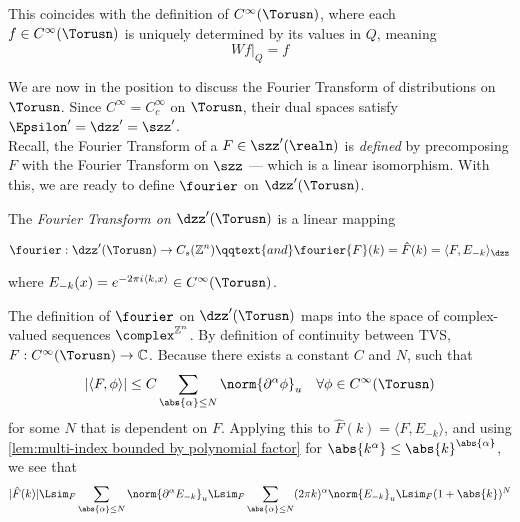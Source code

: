 \documentclass[../main-v2-manifolds.tex]{subfiles}
\begin{document}
This coincides with the definition of $C^\infty(\Torusn)$, where each $f\in C^\infty(\Torusn)$ is uniquely determined by its values in $Q$, meaning
\[
W {f\vert_{Q}} = f
\]


We are now in the position to discuss the Fourier Transform of distributions on $\Torusn$. Since $C^\infty =  C_c^\infty$ on $\Torusn$, their dual spaces satisfy $\Epsilon' = \dzz' = \szz'$. \\

Recall, the Fourier Transform of a $F\in\szz'(\realn)$ is \emph{defined} by precomposing $F$ with the Fourier Transform on $\szz$ --- which is a linear isomorphism. With this, we are ready to define $\fourier$ on $\dzz'(\Torusn)$.

\begin{definition}
The \emph{Fourier Transform on $\dzz'(\Torusn)$} is a linear mapping

\[
\fourier: \dzz'(\Torusn)\to C_s(\mathbb{Z}^n)\qqtext{and}\fourier{F}(k)=\hat{F}(k)=\langle F, E_{-k}\rangle_{\dzz}
\]

where $E_{-k}(x) = e^{-2\pi i\langle k,x\rangle}\in C^\infty(\Torusn)$.
\end{definition}
\begin{remark}
The definition of $\fourier$ on $\dzz'(\Torusn)$ maps into the space of complex-valued sequences $\complex^{\mathbb{Z}^n}$. By definition of continuity between TVS, $F: C^\infty(\Torusn)\to\mathbb{C}$. Because there exists a constant $C$ and $N$, such that 
\[
\vert \langle F,\phi\rangle\vert \leq C\sum_{\abs{\alpha}\leq N}\norm{\partial^\alpha \phi}_u\quad\forall \phi\in C^\infty(\Torusn)
\]
for some $N$ that is dependent on $F$. Applying this to $\hat{F}(k) = \langle F,E_{-k}\rangle$, and using \cref{lem:multi-index bounded by polynomial factor} for $\abs{k^\alpha}\leq\abs{k}^{\abs{\alpha}}$, we see that
\[
\vert\hat{F}(k)\vert\Lsim_F \sum_{\abs{\alpha}\leq N}\norm{\partial^\alpha E_{-k}}_u\Lsim_F \sum_{\abs{\alpha}\leq N}(2\pi k)^{\alpha}\norm{E_{-k}}_u\Lsim_F (1+\abs{k})^N
\]
\end{remark}
\end{document}
